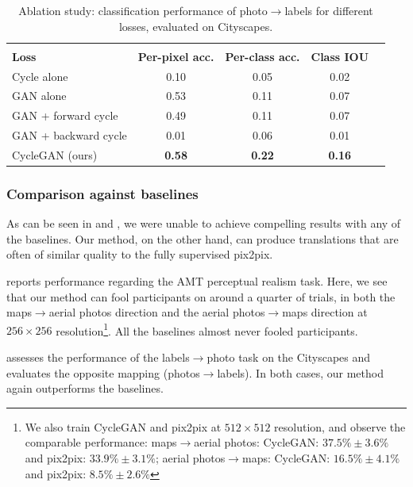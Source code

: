 \begin{table}
\centering
\scalebox{0.75} {
\begin{tabular}{lcccc}
 & & & \\
\textbf{Loss} & \textbf{Per-pixel acc.} & \textbf{Per-class acc.} & \textbf{Class IOU} \\ \hline
Cycle alone & 0.10 & 0.05 & 0.02 \\
GAN alone & 0.53 & 0.11 & 0.07 \\
GAN + forward cycle & 0.49 & 0.11 & 0.07 \\ 
GAN + backward cycle & 0.01 & 0.06 & 0.01 \\ 
CycleGAN (ours)& {\bf 0.58} & {\bf 0.22} & {\bf 0.16} \\  
\end{tabular} }
\vspace{-0.1in}
\caption {Ablation study: classification performance of photo$\rightarrow$labels for different losses, evaluated on Cityscapes. }
\vspace{-0.2in}
\end{table}

\subsubsection{Comparison against baselines}
As can be seen in  and , we were unable to achieve compelling results with any of the baselines. Our method, on the other hand, can produce translations that are often of similar quality to the fully supervised pix2pix.

 reports performance regarding the AMT perceptual realism task. Here, we see that our method can fool participants on around a quarter of trials, in both the maps$\rightarrow$aerial photos direction and the aerial photos$\rightarrow$maps direction at $256\times 256$ resolution\footnote{We also train CycleGAN and pix2pix at $512\times 512$ resolution, and observe the comparable performance:  maps$\rightarrow$aerial photos: CycleGAN: $37.5\% \pm 3.6\%$ and pix2pix: $33.9\% \pm 3.1\%$; aerial photos$\rightarrow$maps: CycleGAN: $16.5\% \pm 4.1\%$ and pix2pix: $8.5\% \pm 2.6\%$}. All the baselines almost never fooled participants.

 assesses the performance of the labels$\rightarrow$photo task on the Cityscapes and  evaluates the opposite mapping (photos$\rightarrow$labels). In both cases, our method again outperforms the baselines.

